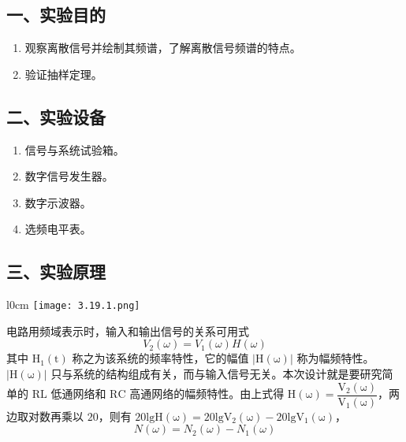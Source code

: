 \documentclass[dvipsnames, svgnames,a4paper,11pt]{article}
\begin{document}
\subsection*{一、实验目的}
\begin{enumerate}
	\item 观察离散信号并绘制其频谱，了解离散信号频谱的特点。
	\item 验证抽样定理。
\end{enumerate}

\subsection*{二、实验设备}
\begin{enumerate}
	\item 信号与系统试验箱。
	\item 数字信号发生器。
	\item 数字示波器。
	\item 选频电平表。
\end{enumerate}


\subsection*{三、实验原理}
\begin{wrapfigure}{l}{0cm} %
	\centering
	\texttt{[image: 3.19.1.png]}
	\caption{}
\end{wrapfigure}
电路用频域表示时，输入和输出信号的关系可用式 
\begin{equation}
  V_2(\omega) = V_1(\omega)H(\omega)
\end{equation}
其中 $\mathrm{H_1(t)}$ 称之为该系统的频率特性，它的幅值 $\mathrm{|H(\omega)|}$ 称为幅频特性。$\mathrm{|H(\omega)|}$ 只与系统的结构组成有关，而与输入信号无关。本次设计就是要研究简单的 $\mathrm{RL}$ 低通网络和 $\mathrm{RC}$ 高通网络的幅频特性。由上式得 $\mathrm{H(\omega) = \dfrac{V_2(\omega)}{V_1(\omega)}}$，两边取对数再乘以 $20$，则有 $\mathrm{20lgH(\omega) = 20lgV_2(\omega) - 20lgV_1(\omega)}$，
\begin{equation}
  N(\omega) = N_2(\omega) - N_1(\omega)
\end{equation}

\begin{figure}[htbp]
	\centering
	\caption{}
\end{figure}
\end{document}

